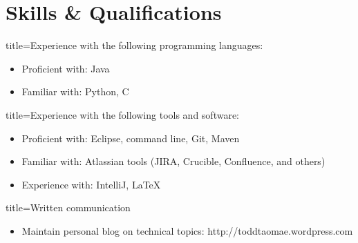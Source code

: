 \documentclass{resume}
\begin{document}
\section*{Skills \& Qualifications}
\begin{skill}{title=Experience with the following programming languages:}
    \begin{itemize}
        \item{Proficient with: Java}
        \item{Familiar with: Python, C}
    \end{itemize}
\end{skill}

\begin{skill}{title=Experience with the following tools and software:}
    \begin{itemize}
        \item{Proficient with: Eclipse, command line, Git, Maven}
        \item{Familiar with: Atlassian tools (JIRA, Crucible, Confluence, and others)}
        \item{Experience with: IntelliJ, \LaTeX}
    \end{itemize}
\end{skill}

\begin{skill}{title=Written communication}
    \begin{itemize}
        \item{Maintain personal blog on technical topics: http://toddtaomae.wordpress.com}
    \end{itemize}
\end{skill}
\end{document}
